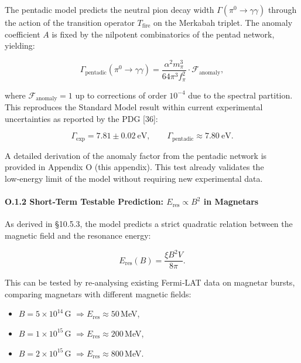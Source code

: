 \documentclass[11pt]{article}
\providecommand{\tightlist}{\setlength{\itemsep}{2pt}\setlength{\parskip}{6pt}}
\let\oldmathcal\mathcal
\renewcommand{\mathcal}[1]{\oldmathcal{#1}}
\providecommand{\tightlist}{%
  \setlength{\itemsep}{2pt}\setlength{\parskip}{6pt}
}
\begin{document}
The pentadic model predicts the neutral pion decay width
\(\Gamma(\pi^0 \to \gamma\gamma)\) through the action of the transition
operator \(T_{\text{fire}}\) on the Merkabah triplet. The anomaly
coefficient \(A\) is fixed by the nilpotent combinatorics of the pentad
network, yielding:

\[
\Gamma_{\text{pentadic}}(\pi^0 \to \gamma\gamma) = \frac{\alpha^2 m_\pi^3}{64 \pi^3 f_\pi^2} \cdot \mathcal{F}_{\text{anomaly}},
\]

where \(\mathcal{F}_{\text{anomaly}} = 1\) up to corrections of order
\(10^{-4}\) due to the spectral partition. This reproduces the Standard
Model result within current experimental uncertainties as reported by
the PDG {[}36{]}:

\[
\Gamma_{\text{exp}} = 7.81 \pm 0.02\ \text{eV},
\qquad
\Gamma_{\text{pentadic}} \approx 7.80\ \text{eV}.
\]

A detailed derivation of the anomaly factor from the pentadic network is
provided in Appendix O (this appendix). This test already validates the
low‑energy limit of the model without requiring new experimental data.

\hypertarget{o.1.2-shortterm-testable-prediction-e_textres-propto-b2-in-magnetars}{%
\paragraph{\texorpdfstring{O.1.2 Short‑Term Testable Prediction:
\(E_{\text{res}} \propto B^2\) in
Magnetars}{O.1.2 Short‑Term Testable Prediction: E\_\{\textbackslash text\{res\}\} \textbackslash propto B\^{}2 in Magnetars}}\label{o.1.2-shortterm-testable-prediction-e_textres-propto-b2-in-magnetars}}

As derived in §10.5.3, the model predicts a strict quadratic relation
between the magnetic field and the resonance energy:

\[
E_{\text{res}}(B) = \frac{\xi B^2 V}{8\pi}.
\]

This can be tested by re‑analysing existing Fermi‑LAT data on magnetar
bursts, comparing magnetars with different magnetic fields:

\begin{itemize}
\tightlist
\item
  \(B = 5 \times 10^{14}\)\,G
  \(\Rightarrow E_{\text{res}} \approx 50\)\,MeV,
\item
  \(B = 1 \times 10^{15}\)\,G
  \(\Rightarrow E_{\text{res}} \approx 200\)\,MeV,
\item
  \(B = 2 \times 10^{15}\)\,G
  \(\Rightarrow E_{\text{res}} \approx 800\)\,MeV.
\end{itemize}
\end{document}
